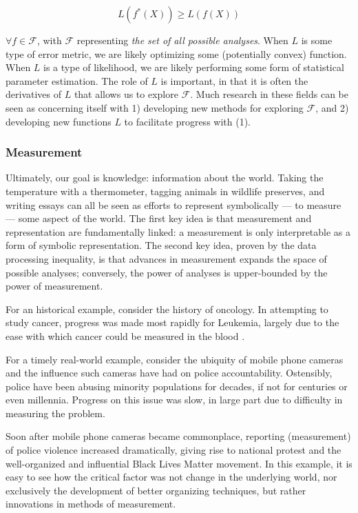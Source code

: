 \[
L(f^*(X)) \geq L(f(X))
\]

$\forall f \in \mathcal{F}$, with $\mathcal{F}$ representing \textit{the set of all possible analyses}.
When $L$ is some type of error metric, we are likely optimizing some (potentially convex) function.
When $L$ is a type of likelihood, we are likely performing some form of statistical parameter estimation.
The role of $L$ is important, in that it is often the derivatives of $L$ that allows us to explore $\mathcal{F}$.
Much research in these fields can be seen as concerning itself with 1) developing new methods for exploring $\mathcal{F}$, and 2) developing new functions $L$ to facilitate progress with (1).

\subsubsection{Measurement}

Ultimately, our goal is knowledge: information about the world.
Taking the temperature with a thermometer, tagging animals in wildlife preserves, and writing essays can all be seen as efforts to represent symbolically --- to measure --- some aspect of the world.
The first key idea is that measurement and representation are fundamentally linked: a measurement is only interpretable as a form of symbolic representation.
The second key idea, proven by the data processing inequality, is that advances in measurement expands the space of possible analyses; conversely, the power of analyses is upper-bounded by the power of measurement.

\bigskip

For an historical example, consider the history of oncology.
In attempting to study cancer, progress was made most rapidly for Leukemia, largely due to the ease with which cancer could be measured in the blood \citep{mukherjee}.

For a timely real-world example, consider the ubiquity of mobile phone cameras and the influence such cameras have had on police accountability.
Ostensibly, police have been abusing minority populations for decades, if not for centuries or even millennia.
Progress on this issue was slow, in large part due to difficulty in measuring the problem.

Soon after mobile phone cameras became commonplace, reporting (measurement) of police violence increased dramatically, giving rise to national protest and the well-organized and influential Black Lives Matter movement.
In this example, it is easy to see how the critical factor was not change in the underlying world, nor exclusively the development of better organizing techniques, but rather innovations in methods of measurement.

